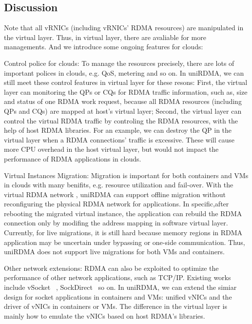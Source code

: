 \subsection{Discussion}
Note that all vRNICs (including vRNICs' RDMA resources) are manipulated in the virtual layer. Thus, in virtual layer, there are avaliable for more managements. And we introduce some ongoing features for clouds:

Control police for clouds: To manage the resources precisely, there are lots of important polices in clouds, e.g. QoS, metering and so on. In uniRDMA, we can still meet these control features in virtual layer for these resons:  First,  the virtual layer can monitoring the QPs or CQs for RDMA traffic information, such as,  size and status of one RDMA work request, because all RDMA resources (including QPs and CQs) are mapped at host's virtual layer; Second, the virtual layer can  control the virtual RDMA traffic by controling the RDMA resources,  with the help of host RDMA libraries. For an example,  we can destroy the QP in the virtual layer when a RDMA connections' traffic is excessive.  These will cause more CPU overhead in the host virtual layer, but would not impact the performance of RDMA applications in clouds.

Virtual Instances Migration: Migration is important  for both containers and VMs in clouds with many benifits, e.g. resource utilization and fail-over. With the virtual RDMA network , uniRDMA can support offline migration without reconfiguring the physical RDMA network for applications. In specific,after rebooting the migrated virtual instance, the application can rebuild the RDMA connection  only by modifing the address mapping in software virtual layer. Currently, for live migrations, it is still hard because memory regions in RDMA application may be uncertain under bypassing or one-side communication. Thus, uniRDMA does not support live migrations for both VMs and containers.

Other network extensions: RDMA can also be exploited to optimize the performance of other network applications,  such as TCP/IP.  Existing works include vSocket ~\cite{wang2019vsocket}, SockDirect~\cite{li2019socksdirect} so on. In uniRDMA, we can extend the simiar design for socket applications in containers and VMs: unified vNICs and the driver of vNICs in containers or VMs.  The difference in the virtual layer is mainly how to emulate the vNICs based on host RDMA's libraries. 